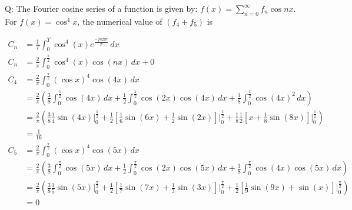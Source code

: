\documentclass[journal,12pt,onecolumn]{IEEEtran}
\theoremstyle{remark}
\begin{document}
\let\vec\mathbf







\bigskip


Q: The Fourier cosine series of a function is given by: $f(x) = \sum_{n=0}^{\infty} f_{n}\cos{nx}$. For $f(x) = \cos^{4}x$, the numerical value of $(f_{4} + f_{5})$ is
 
\solution
\fi
\begin{table}[h]

\end{table}
\begin{align}
C_n &= \frac{1}{T} \int_{0}^{T} \cos^4(x) e^{\frac{-jn2\pi t}{T}} \,dx \\
    C_n &= \frac{2}{\pi} \int_{0}^{\frac{\pi}{2}} \cos^4(x) \cos(nx) \,dx + 0 \\
   C_4 &= \frac{2}{\pi} \int_{0}^{\frac{\pi}{2}} (\cos x)^4 \cos(4x) \, dx \\
&= \frac{2}{\pi} \left( \frac{3}{8} \int_{0}^{\frac{\pi}{2}} \cos(4x) \, dx + \frac{1}{2} \int_{0}^{\frac{\pi}{2}} \cos(2x) \cos(4x) \, dx + \frac{1}{8} \int_{0}^{\frac{\pi}{2}} \cos(4x)^2 \, dx \right) \\
&= \frac{2}{\pi} \left( \frac{3}{8} \frac{1}{4} \sin(4x) \Bigg|_{0}^{\frac{\pi}{2}} + \frac{1}{2} \left[\frac{1}{6} \sin(6x) + \frac{1}{2}\sin(2x) \right] \Bigg|_{0}^{\frac{\pi}{2}} + \frac{1}{8} \frac{1}{2} \left[ x + \frac{1}{8} \sin(8x) \right] \Bigg|_{0}^{\frac{\pi}{2}}  \right) \\
&=\frac{1}{16} \\
    C_5 &= \frac{2}{\pi} \int_{0}^{\frac{\pi}{2}} (\cos x)^4 \cos(5x) \, dx \\
&= \frac{2}{\pi} \left( \frac{3}{8} \int_{0}^{\frac{\pi}{2}} \cos(5x) \, dx + \frac{1}{2} \int_{0}^{\frac{\pi}{2}} \cos(2x) \cos(5x) \, dx + \frac{1}{8} \int_{0}^{\frac{\pi}{2}} \cos(4x) \cos(5x) \, dx \right) \\
&= \frac{2}{\pi} \left(\frac{3}{8} \frac{1}{5} \sin(5x) \Bigg|_{0}^{\frac{\pi}{2}} + \frac{1}{2} \left[ \frac{1}{7} \sin(7x) + \frac{1}{3} \sin(3x) \right] \Bigg|_{0}^{\frac{\pi}{2}} + \frac{1}{2} \left[ \frac{1}{9} \sin(9x) + \sin(x) \right] \Bigg|_{0}^{\frac{\pi}{2}} \right) \\
&= 0 
\end{align}
\end{document}
